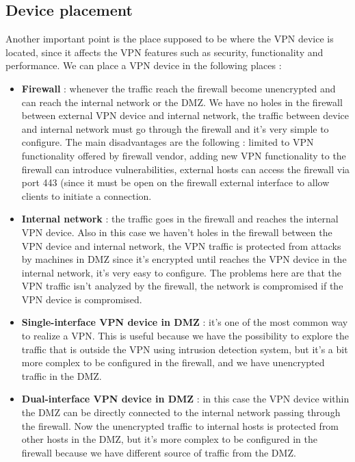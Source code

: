 \documentclass[11pt]{article}
\begin{document}
\subsection{Device placement}
Another important point is the place supposed to be where the VPN device is located, since it affects the VPN features such as security, functionality and performance. We can place a VPN device in the following places :
\begin{itemize}
\item \textbf{Firewall} : whenever the traffic reach the firewall become unencrypted and can reach the internal network or the DMZ. We have no holes in the firewall between external VPN device and internal network, the traffic between device and internal network must go through the firewall and it's very simple to configure. The main disadvantages are the following : limited to VPN functionality offered by firewall vendor, adding new VPN functionality to the firewall can introduce vulnerabilities, external hosts can access the firewall via port 443 (since it must be open on the firewall external interface to allow clients to initiate a connection.
\item \textbf{Internal network} : the traffic goes in the firewall and reaches the internal VPN device. Also in this case we haven't holes in the firewall between the VPN device and internal network, the VPN traffic is protected from attacks by machines in DMZ since it's encrypted until reaches the VPN device in the internal network, it's very easy to configure. The problems here are that the VPN traffic isn't analyzed by the firewall, the network is compromised if the VPN device is compromised.
\item \textbf{Single-interface VPN device in DMZ} : it's one of the most common way to realize a VPN. This is useful because we have the possibility to explore the traffic that is outside the VPN using intrusion detection system, but it's a bit more complex to be configured in the firewall, and we have unencrypted traffic in the DMZ.
\item \textbf{Dual-interface VPN device in DMZ} : in this case the VPN device within the DMZ can be directly connected to the internal network passing through the firewall. Now the unencrypted traffic to internal hosts is protected from other hosts in the DMZ, but it's more complex to be configured in the firewall because we have different source of traffic from the DMZ. 
\end{itemize} 
\end{document}
